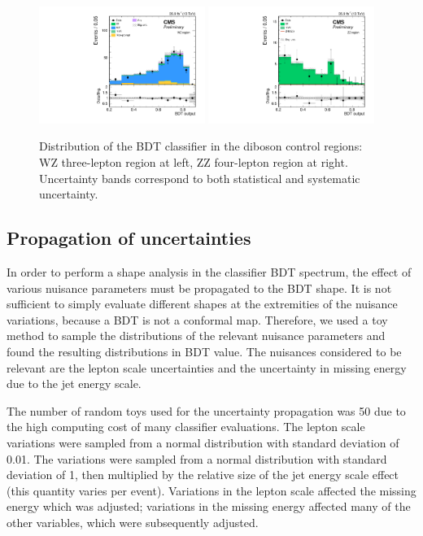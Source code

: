 \begin{figure}[htbp]
\begin{center}
\includegraphics[width=0.48\textwidth]{figures/fullsel_bdt_wz_postfit.pdf}
\includegraphics[width=0.48\textwidth]{figures/fullsel_bdt_zz_postfit.pdf}
\caption{Distribution of the BDT classifier in the diboson control regions: WZ three-lepton region at left, ZZ four-lepton region at right. Uncertainty bands correspond to both statistical and systematic uncertainty.}
\label{fig:bdt_vv}
\end{center}
\end{figure}
\clearpage
\subsection{Propagation of uncertainties} 
In order to perform a shape analysis in the classifier BDT spectrum, the effect of various nuisance parameters must be propagated to the BDT shape.
It is not sufficient to simply evaluate different shapes at the extremities of the nuisance variations, because a BDT is not a conformal map.
Therefore, we used a toy method to sample the distributions of the relevant nuisance parameters and found the resulting distributions in BDT value.
The nuisances considered to be relevant are the lepton scale uncertainties and the uncertainty in missing energy due to the jet energy scale.

The number of random toys used for the uncertainty propagation was 50 due to the high computing cost of many classifier evaluations. 
The lepton scale variations were sampled from a normal distribution with standard deviation of 0.01.
The \met variations were sampled from a normal distribution with standard deviation of 1, then multiplied by the relative size of the jet energy scale effect (this quantity varies per event).
Variations in the lepton scale affected the missing energy which was adjusted; variations in the missing energy affected many of the other variables, which were subsequently adjusted. 

